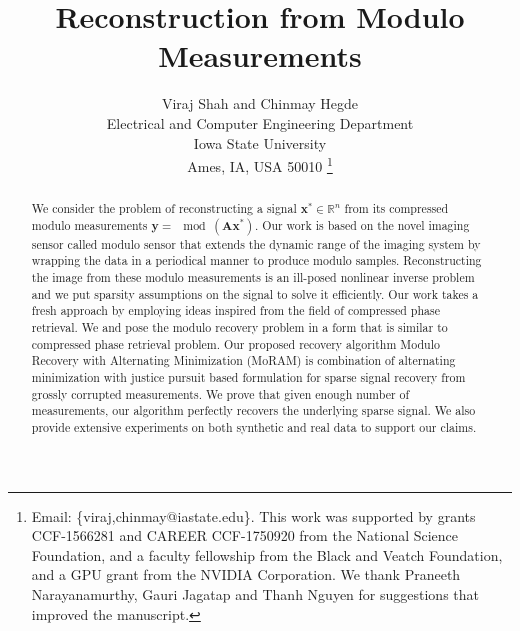 \documentclass[10pt,journal]{IEEEtran}
\def\R{{\mathbb{R}}}
\newcommand{\mb}[1]{\mathbf{#1}}
\begin{document}
\title{Reconstruction from Modulo Measurements}

\author{
	Viraj Shah and Chinmay Hegde \\
	Electrical and Computer Engineering Department \\
	Iowa State University \\
	Ames, IA, USA 50010
	\thanks{Email: \{viraj,chinmay@iastate.edu\}. This work was supported by grants CCF-1566281 and CAREER CCF-1750920 from the National Science Foundation, and a faculty fellowship from the Black and Veatch Foundation, and a GPU grant from the NVIDIA Corporation.	
	We thank Praneeth Narayanamurthy, Gauri Jagatap and Thanh Nguyen for suggestions that improved the manuscript.
}
}


\maketitle

\begin{abstract}
	We consider the problem of reconstructing a signal $\mb{x^*} \in \R^n$ from its compressed modulo measurements $\mb{y}=\mod(\mb{Ax^*})$. Our work is based on the novel imaging sensor called modulo sensor that extends the dynamic range of the imaging system by wrapping the data in a periodical manner to produce modulo samples. Reconstructing the image from these modulo measurements is an ill-posed nonlinear inverse problem and we put sparsity assumptions on the signal to solve it efficiently. Our work takes a fresh approach by employing ideas inspired from the field of compressed phase retrieval. We and pose the modulo recovery problem in a form that is similar to compressed phase retrieval problem. Our proposed recovery algorithm Modulo Recovery with Alternating Minimization (MoRAM) is combination of alternating minimization with justice pursuit based formulation for sparse signal recovery from grossly corrupted measurements. We prove that given enough number of measurements, our algorithm perfectly recovers the underlying sparse signal. We also provide extensive experiments on both synthetic and real data to support our claims. 
\end{abstract}







%
%
%


%
%
\end{document}
